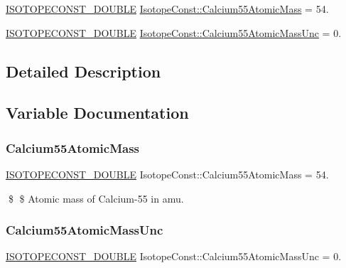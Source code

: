 \begin{DoxyCompactItemize}
\item 
\mbox{\hyperlink{group___isotope_const-_macros_ga8f45a7272ce02c0b4c65c44636ed719a}{I\+S\+O\+T\+O\+P\+E\+C\+O\+N\+S\+T\+\_\+\+D\+O\+U\+B\+LE}} \mbox{\hyperlink{group___isotope_const-_calcium-_ca55_gadde1a1e9a0c09460189b3855b93021bb}{Isotope\+Const\+::\+Calcium55\+Atomic\+Mass}} = 54.
\item 
\mbox{\hyperlink{group___isotope_const-_macros_ga8f45a7272ce02c0b4c65c44636ed719a}{I\+S\+O\+T\+O\+P\+E\+C\+O\+N\+S\+T\+\_\+\+D\+O\+U\+B\+LE}} \mbox{\hyperlink{group___isotope_const-_calcium-_ca55_gaae0321592c564b5a17dfab03ecb117b3}{Isotope\+Const\+::\+Calcium55\+Atomic\+Mass\+Unc}} = 0.
\end{DoxyCompactItemize}


\subsection{Detailed Description}


\subsection{Variable Documentation}
\mbox{\label{group___isotope_const-_calcium-_ca55_gadde1a1e9a0c09460189b3855b93021bb}} 
\subsubsection{\texorpdfstring{Calcium55\+Atomic\+Mass}{Calcium55AtomicMass}}
{\footnotesize\ttfamily \mbox{\hyperlink{group___isotope_const-_macros_ga8f45a7272ce02c0b4c65c44636ed719a}{I\+S\+O\+T\+O\+P\+E\+C\+O\+N\+S\+T\+\_\+\+D\+O\+U\+B\+LE}} Isotope\+Const\+::\+Calcium55\+Atomic\+Mass = 54.}

\$ \$ Atomic mass of Calcium-\/55 in amu. \mbox{\label{group___isotope_const-_calcium-_ca55_gaae0321592c564b5a17dfab03ecb117b3}} 
\subsubsection{\texorpdfstring{Calcium55\+Atomic\+Mass\+Unc}{Calcium55AtomicMassUnc}}
{\footnotesize\ttfamily \mbox{\hyperlink{group___isotope_const-_macros_ga8f45a7272ce02c0b4c65c44636ed719a}{I\+S\+O\+T\+O\+P\+E\+C\+O\+N\+S\+T\+\_\+\+D\+O\+U\+B\+LE}} Isotope\+Const\+::\+Calcium55\+Atomic\+Mass\+Unc = 0.}

